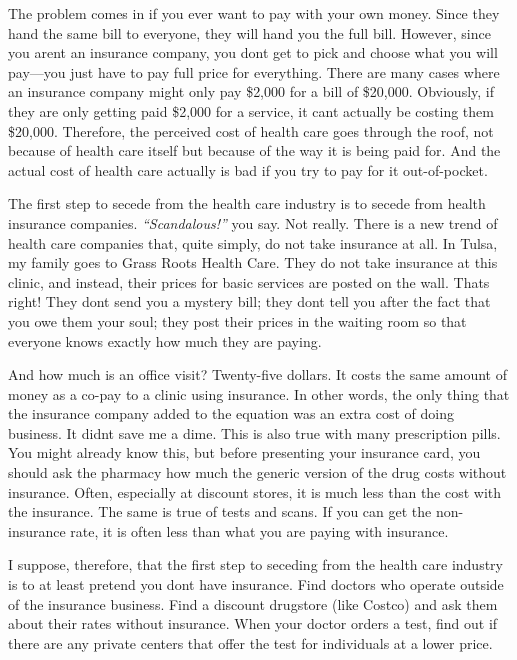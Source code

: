 The problem comes in if you ever want to pay with your own money. Since
they hand the same bill to everyone, they will hand you the full bill.
However, since you aren{\textquotesingle}t an insurance company, you
don{\textquotesingle}t get to pick and choose what you will pay—you
just have to pay full price for everything. There are many cases where
an insurance company might only pay \$2,000 for a bill of \$20,000.
Obviously, if they are only getting paid \$2,000 for a service, it
can{\textquotesingle}t actually be costing them \$20,000. Therefore,
the perceived cost of health care goes through the roof, not because of
health care itself but because of the way it is being paid for. And the
actual cost of health care actually is bad if you try to pay for it
out-of-pocket.

The first step to secede from the health care industry is to secede from
health insurance companies.
\textit{“}\textit{Scandalous!”
}you say. Not really.
There is a new trend of health care companies that, quite simply, do
not take insurance at all. In Tulsa, my family goes to Grass Roots
Health Care.  They do not take insurance at this clinic, and instead,
their prices for basic services are posted on the wall. 
That{\textquotesingle}s
right! They
don{\textquotesingle}t send you a mystery bill; they
don{\textquotesingle}t tell you after the fact that you owe them your
soul; they post their prices in the waiting room so that everyone knows
exactly how much they are paying.

And how much is an office visit?  Twenty-five dollars. It costs the same
amount of money as a co-pay to a clinic using insurance. In other
words, the only thing that the insurance company added to the equation
was an extra cost of doing business. It didn{\textquotesingle}t save me
a dime. This is also true with many prescription pills.
You might already know
this, but before presenting your insurance card, you should ask the
pharmacy how much the generic version of the drug costs without
insurance. Often, especially at discount stores, it is much less than
the cost with the insurance.  The same is true of tests and scans. If
you can get the non-insurance rate, it is often less than what you are
paying with insurance.

I suppose, therefore,
that the
first step to seceding from the health care industry is to at least
pretend you don{\textquotesingle}t have insurance. Find doctors who
operate outside of the insurance business. Find a discount drugstore
(like Costco) and ask them about their rates without insurance. When
your doctor orders a test, find out if there are any private centers
that offer the test for individuals at a lower price. 

